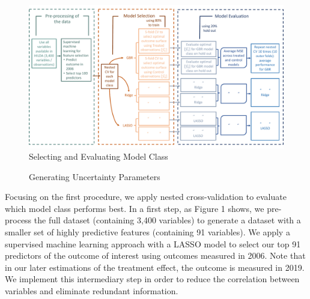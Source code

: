 \documentclass[12pt, a4paper]{article}
\begin{document}
\singlespacing
\begin{figure}[htbp]
\centering
\caption{Selecting and Evaluating Model Class}
  \label{fig:exp_model}
    \includegraphics[scale=0.48]{_figures/explainer1.pdf}
\end{figure}

\begin{figure}[htbp]
\centering
\caption{Generating Uncertainty Parameters}
  \label{fig:exp_param}
\end{figure}
\doublespacing

Focusing on the first procedure, we apply nested cross-validation to evaluate
which model class performs best. In a first step, as Figure 1 shows, we
pre-process the full dataset (containing 3,400 variables) to generate a dataset
with a smaller set of highly predictive features (containing 91 variables). We
apply a supervised machine learning approach with a LASSO model to select our
top 91 predictors of the outcome of interest using outcomes measured in 2006.
Note that in our later estimations of the treatment effect, the outcome is
measured in 2019. We implement this intermediary step in order to reduce the
correlation between variables and eliminate redundant information.
\end{document}
